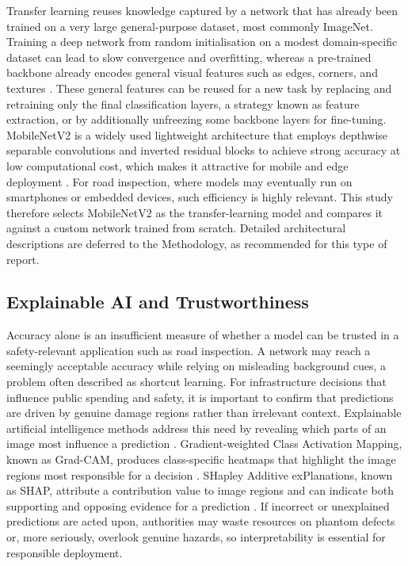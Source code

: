 \documentclass[preprint,12pt]{elsarticle}
\begin{document}
Transfer learning reuses knowledge captured by a network that has already been trained on a very large general-purpose dataset, most commonly ImageNet.
Training a deep network from random initialisation on a modest domain-specific dataset can lead to slow convergence and overfitting, whereas a pre-trained backbone already encodes general visual features such as edges, corners, and textures \cite{pan2009survey}.
These general features can be reused for a new task by replacing and retraining only the final classification layers, a strategy known as feature extraction, or by additionally unfreezing some backbone layers for fine-tuning.
MobileNetV2 is a widely used lightweight architecture that employs depthwise separable convolutions and inverted residual blocks to achieve strong accuracy at low computational cost, which makes it attractive for mobile and edge deployment \cite{sandler2018mobilenetv2}.
For road inspection, where models may eventually run on smartphones or embedded devices, such efficiency is highly relevant.
This study therefore selects MobileNetV2 as the transfer-learning model and compares it against a custom network trained from scratch.
Detailed architectural descriptions are deferred to the Methodology, as recommended for this type of report.

\subsection{Explainable AI and Trustworthiness}

Accuracy alone is an insufficient measure of whether a model can be trusted in a safety-relevant application such as road inspection.
A network may reach a seemingly acceptable accuracy while relying on misleading background cues, a problem often described as shortcut learning.
For infrastructure decisions that influence public spending and safety, it is important to confirm that predictions are driven by genuine damage regions rather than irrelevant context.
Explainable artificial intelligence methods address this need by revealing which parts of an image most influence a prediction \cite{dwivedi2023explainable}.
Gradient-weighted Class Activation Mapping, known as Grad-CAM, produces class-specific heatmaps that highlight the image regions most responsible for a decision \cite{selvaraju2017gradcam}.
SHapley Additive exPlanations, known as SHAP, attribute a contribution value to image regions and can indicate both supporting and opposing evidence for a prediction \cite{lundberg2017unified}.
If incorrect or unexplained predictions are acted upon, authorities may waste resources on phantom defects or, more seriously, overlook genuine hazards, so interpretability is essential for responsible deployment.
\end{document}
